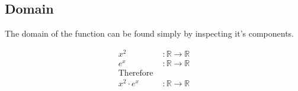 \subsection{Domain}

The domain of the function can be found simply by inspecting it's components.

\[
\begin{aligned}
    x^2 & : \mathbb{R} \rightarrow \mathbb{R} \\
    e^x & : \mathbb{R} \rightarrow \mathbb{R} \\
    \text{Therefore } \\
    x^2\cdot e^x & : \mathbb{R} \rightarrow \mathbb{R}
\end{aligned}
\]